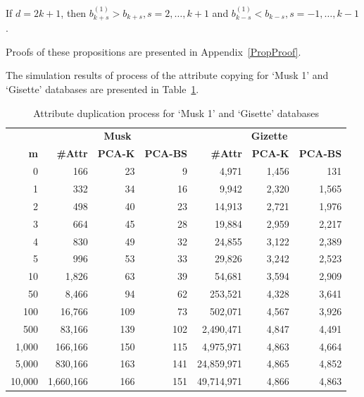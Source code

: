 \documentclass[entropy,article,submit,moreauthors,pdftex]{Definitions/mdpi}
\begin{document}
\begin{Proposition}\label{prop2}
If $d=2k+1$, then $b^{(1)}_{k+s}>b_{k+s}, s=2,\ldots,k+1$ and $b^{(1)}_{k-s}<b_{k-s}, s=-1,\ldots,k-1$.
\end{Proposition}

Proofs of these propositions are presented in Appendix~\ref{PropProof}.

The simulation results of process of the attribute copying for `Musk 1' and `Gisette' databases are presented in Table~\ref{tab:DuplDist}.

\begin{table}[t]
\caption{Attribute duplication process for `Musk 1' and `Gisette' databases}
\centering
\begin{tabular}{r|rrr|rrr}
\toprule

&\multicolumn{3}{|c|}{\textbf{Musk}}&\multicolumn{3}{c|}{\textbf{Gizette}}\\ \cline{2-7}
\textbf{m}&\textbf{\#Attr}&\textbf{PCA-K}&\textbf{PCA-BS}&\textbf{\#Attr}&\textbf{PCA-K}&\textbf{PCA-BS}\\
\midrule
0&166&23&9&4,971&1,456&131\\
1&332&34&16&9,942&2,320&1,565\\
2&498&40&23&14,913&2,721&1,976\\
3&664&45&28&19,884&2,959&2,217\\
4&830&49&32&24,855&3,122&2,389\\
5&996&53&33&29,826&3,242&2,523\\
10&1,826&63&39&54,681&3,594&2,909\\
50&8,466&94&62&253,521&4,328&3,641\\
100&16,766&109&73&502,071&4,567&3,926\\
500&83,166&139&102&2,490,471&4,847&4,491\\
1,000&166,166&150&115&4,975,971&4,863&4,664\\
5,000&830,166&163&141&24,859,971&4,865&4,852\\
10,000&1,660,166&166&151&49,714,971&4,866&4,863\\
\bottomrule

\end{tabular}
\label{tab:DuplDist}
\end{table}
\end{document}

